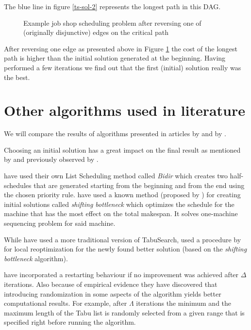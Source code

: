 \documentclass[14pt]{article}
\begin{document}
The blue line in figure \ref{ts-sol-2} represents the longest path in this DAG.

\begin{figure}[H]
  \centering
  \def\svgwidth{0.5\columnwidth}
  
  \caption{Example job shop scheduling problem after reversing one of (originally disjunctive) edges on the critical path}
  \label{ts-sol-3}
\end{figure}

After reversing one edge as presented above in Figure \ref{ts-sol-3} the cost of the longest path is higher than the initial solution generated at the beginning.
Having performed a few iterations we find out that the first (initial) solution really was the best.

\section{Other algorithms used in literature}\label{other-algs}

We will compare the results of algorithms presented in articles by \citet{amico-trubian} and by \citet{pezzella}.

Choosing an initial solution has a great impact on the final result as mentioned by \citet{pezzella} and previously observed by .

\citet{amico-trubian} have used their own List Scheduling method called \textit{Bidir} which creates two half-schedules that are generated starting from the beginning and from the end using the chosen priority rule.
\citet{pezzella} have used a known method (proposed by \citet{adams}) for creating initial solutions called \textit{shifting bottleneck} which optimizes the schedule for the machine that has the most effect on the total makespan. It solves one-machine sequencing problem for said machine.

While \citet{amico-trubian} have used a more traditional version of TabuSearch, \citet{pezzella} used a procedure by \citet{carlier} for local reoptimization for the newly found better solution (based on the \textit{shifting bottleneck} algorithm).

\citet{amico-trubian} have incorporated a restarting behaviour if no improvement was achieved after $\Delta$ iterations. Also because of empirical evidence they have discovered that introducing randomization in some aspects of the algorithm yields better computational results. For example, after $\Lambda$ iterations the minimum and the maximum length of the Tabu list is randomly selected from a given range that is specified right before running the algorithm.
\end{document}
